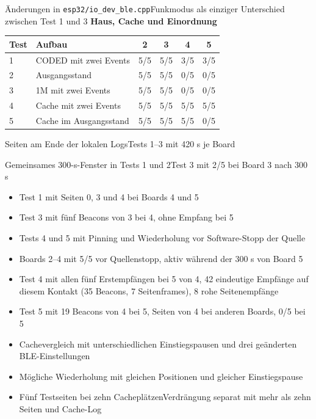 \documentclass[a4paper,11pt]{article}
\begin{document}
{\small Änderungen in \texttt{esp32/io\_dev\_ble.cpp}\enspace\textbullet\enspace Funkmodus als einziger Unterschied zwischen Test 1 und 3}
\newpage
\textbf{Haus, Cache und Einordnung}

\begin{center}\small
\begin{tabular}{llcccc}\toprule
Test & Aufbau & 2 & 3 & 4 & 5 \\ \midrule
1 & CODED mit zwei Events & 5/5 & 5/5 & 3/5 & 3/5 \\
2 & Ausgangsstand & 5/5 & 5/5 & 0/5 & 0/5 \\
3 & 1M mit zwei Events & 5/5 & 5/5 & 0/5 & 0/5 \\
4 & Cache mit zwei Events & 5/5 & 5/5 & 5/5 & 5/5 \\
5 & Cache im Ausgangsstand & 5/5 & 5/5 & 5/5 & 0/5 \\
\bottomrule\end{tabular}\end{center}

{\small Seiten am Ende der lokalen Logs\enspace\textbullet\enspace Tests 1--3 mit 420 s je Board\par
Gemeinsames 300-s-Fenster in Tests 1 und 2\enspace\textbullet\enspace Test 3 mit 2/5 bei Board 3 nach 300 s}

\begin{itemize}
\item Test 1 mit Seiten 0, 3 und 4 bei Boards 4 und 5
\item Test 3 mit fünf Beacons von 3 bei 4, ohne Empfang bei 5
\item Tests 4 und 5 mit Pinning und Wiederholung vor Software-Stopp der Quelle
\item Boards 2--4 mit 5/5 vor Quellenstopp, aktiv während der 300 s von Board 5
\item Test 4 mit allen fünf Erstempfängen bei 5 von 4, 42 eindeutige Empfänge auf diesem Kontakt (35 Beacons, 7 Seitenframes), 8 rohe Seitenempfänge
\item Test 5 mit 19 Beacons von 4 bei 5, Seiten von 4 bei anderen Boards, 0/5 bei 5
\item Cachevergleich mit unterschiedlichen Einstiegspausen und drei geänderten BLE-Einstellungen
\item Mögliche Wiederholung mit gleichen Positionen und gleicher Einstiegspause
\item Fünf Testseiten bei zehn Cacheplätzen\enspace\textbullet\enspace Verdrängung separat mit mehr als zehn Seiten und Cache-Log
\end{itemize}
\end{document}
